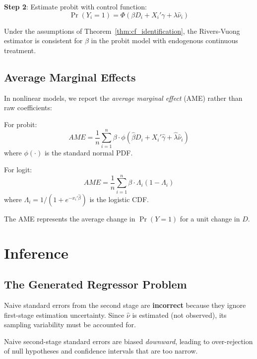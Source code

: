 \textbf{Step 2}: Estimate probit with control function:
\[
\Pr(Y_i = 1) = \Phi(\beta D_i + X_i'\gamma + \lambda \hat{\nu}_i)
\]

\begin{theorem}
\label{thm:rivers_vuong}
Under the assumptions of Theorem~\ref{thm:cf_identification}, the Rivers-Vuong estimator is consistent for $\beta$ in the probit model with endogenous continuous treatment.
\end{theorem}

\subsection{Average Marginal Effects}

In nonlinear models, we report the \emph{average marginal effect} (AME) rather than raw coefficients:

\begin{definition}
\label{def:ame}
For probit:
\[
AME = \frac{1}{n}\sum_{i=1}^n \beta \cdot \phi(\hat{\beta} D_i + X_i'\hat{\gamma} + \hat{\lambda}\hat{\nu}_i)
\]
where $\phi(\cdot)$ is the standard normal PDF.

For logit:
\[
AME = \frac{1}{n}\sum_{i=1}^n \beta \cdot \Lambda_i(1 - \Lambda_i)
\]
where $\Lambda_i = 1/(1 + e^{-x_i'\hat{\beta}})$ is the logistic CDF.
\end{definition}

The AME represents the average change in $\Pr(Y=1)$ for a unit change in $D$.


\section{Inference}
\label{sec:cf_inference}

\subsection{The Generated Regressor Problem}

Naive standard errors from the second stage are \textbf{incorrect} because they ignore first-stage estimation uncertainty. Since $\hat{\nu}$ is estimated (not observed), its sampling variability must be accounted for.

\begin{proposition}
\label{prop:naive_se_bias}
Naive second-stage standard errors are biased \emph{downward}, leading to over-rejection of null hypotheses and confidence intervals that are too narrow.
\end{proposition}

